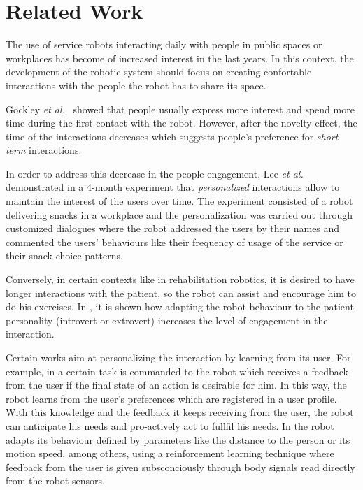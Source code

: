 \section{Related Work}
\vspace{-0.1cm}

The use of service robots interacting daily with people in public
spaces or workplaces has become of increased interest in the last
years.
In this context, the development of the robotic system should focus on
creating confortable interactions with the people the robot has to
share its space.

Gockley \textit{et al.}~\cite{gockley2005} showed that people usually
express more interest and spend more time during the first contact
with the robot. However, after the novelty effect, the time of the
interactions decreases which suggests people's preference for
\textit{short-term} interactions.

In order to address this decrease in the people engagement, Lee
\textit{et al.}~\cite{Lee2012} demonstrated in a 4-month experiment
that \textit{personalized} interactions allow to maintain the interest of the
users over time.  The experiment consisted of a robot delivering
snacks in a workplace and the personalization was carried out through
customized dialogues where the robot addressed the users by their
names and commented the users' behaviours like their frequency of
usage of the service or their snack choice patterns.

Conversely, in certain contexts like in rehabilitation robotics, it is
desired to have longer interactions with the patient, so the robot can
assist and encourage him to do his exercises. In \cite{tapus2008}, it
is shown how adapting the robot behaviour to the patient personality
(introvert or extrovert) increases the level of engagement in the
interaction.

Certain works aim at personalizing the interaction by learning from its
user. For example, in \cite{mason2011robot} a certain task is
commanded to the robot which receives a feedback from the user if the
final state of an action is desirable for him.  In this way, the robot
learns from the user's preferences which are registered in a user
profile. With this knowledge and the feedback it keeps receiving from
the user, the robot can anticipate his needs and pro-actively act to
fullfil his needs.  In \cite{mitsunaga2008adapting} the robot adapts
its behaviour defined by parameters like the distance to the person or
its motion speed, among others, using a reinforcement learning technique
where feedback from the user is given subsconciously through body
signals read directly from the robot sensors.

